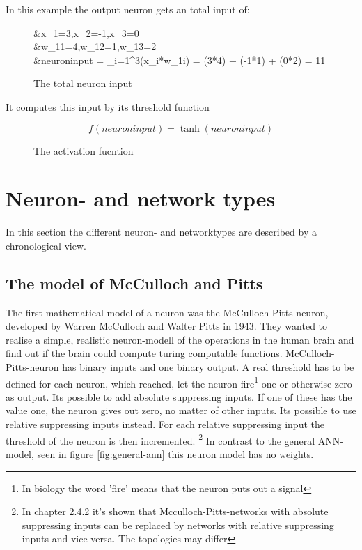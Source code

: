 \documentclass[10pt,a4paper,DIV=11]{scrreprt}
\begin{document}
In this example the output neuron gets an total input of:
\begin{figure}[H]
	\begin{center}
		\begin{flalign*}
		&x_1=3,\quad x_2=-1,\quad x_3=0\\
		&w_{11}=4,\quad w_{12}=1,\quad w_{13}=2\\
		&neuroninput = \sum_{i=1}^{3}(x_{i}*w_{1i}) = (3*4) + (-1*1) + (0*2) = 11
		\end{flalign*}
	\end{center}
	\caption{The total neuron input}
	\label{eq:neuroninputex}
\end{figure}

It computes this input by its threshold function
\begin{figure}[H]
	\begin{center}
		\begin{equation}
		f(neuroninput)=\tanh{(neuroninput)}
		\end{equation}
		\caption{The activation fucntion}
		\label{eq:transferfunction}
	\end{center}
\end{figure} 



\section{Neuron- and network types}
In this section the different neuron- and networktypes are described by a chronological view.
\subsection{The model of McCulloch and Pitts}
\label{sec:pitts}
The first mathematical model of a neuron was the McCulloch-Pitts-neuron,
developed by Warren McCulloch and Walter Pitts in 1943.\cite{NEURONMATH}
They wanted to realise a simple, realistic neuron-modell of the operations in the human brain and find out if the brain could compute turing computable functions.
McCulloch-Pitts-neuron has binary inputs and one binary output.
A real threshold has to be defined for each neuron, which reached, let the neuron fire\footnote{In biology the word 'fire' means that the neuron puts out a signal} one or otherwise zero as output.
Its possible to add absolute suppressing inputs. If one of these has the value one, the neuron gives out zero, no matter of other inputs.
Its possible to use relative suppressing inputs instead. For each relative suppressing input the threshold of the neuron is then incremented.
\footnote{In \cite{rojas} chapter 2.4.2 it's shown that Mcculloch-Pitts-networks with absolute suppressing inputs can be replaced by networks with relative suppressing inputs and vice versa. The topologies may differ}
In contrast to the general ANN-model, seen in figure \ref{fig:general-ann} this neuron model has no weights.
\end{document}
